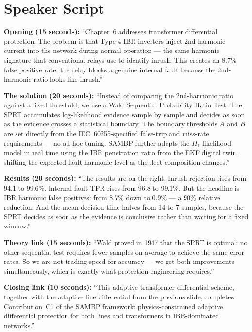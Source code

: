 \documentclass[12pt,a4paper]{article}
\begin{document}
\section{Speaker Script}

\begin{speakbox}
\textbf{Opening (15 seconds):}
``Chapter~6 addresses transformer differential protection. The problem is that Type-4 IBR inverters inject 2nd-harmonic current into the network during normal operation --- the same harmonic signature that conventional relays use to identify inrush. This creates an 8.7\% false positive rate: the relay blocks a genuine internal fault because the 2nd-harmonic ratio looks like inrush.''

\medskip
\textbf{The solution (20 seconds):}
``Instead of comparing the 2nd-harmonic ratio against a fixed threshold, we use a Wald Sequential Probability Ratio Test. The SPRT accumulates log-likelihood evidence sample by sample and decides as soon as the evidence crosses a statistical boundary. The boundary thresholds $A$ and $B$ are set directly from the IEC~60255-specified false-trip and miss-rate requirements --- no ad-hoc tuning. SAMBP further adapts the $H_1$ likelihood model in real time using the IBR penetration ratio from the EKF digital twin, shifting the expected fault harmonic level as the fleet composition changes.''

\medskip
\textbf{Results (20 seconds):}
``The results are on the right. Inrush rejection rises from 94.1 to 99.6\%. Internal fault TPR rises from 96.8 to 99.1\%. But the headline is IBR harmonic false positives: from 8.7\% down to 0.9\% --- a 90\% relative reduction. And the mean decision time halves from 14 to 7 samples, because the SPRT decides as soon as the evidence is conclusive rather than waiting for a fixed window.''

\medskip
\textbf{Theory link (15 seconds):}
``Wald proved in 1947 that the SPRT is optimal: no other sequential test requires fewer samples on average to achieve the same error rates. So we are not trading speed for accuracy --- we get both improvements simultaneously, which is exactly what protection engineering requires.''

\medskip
\textbf{Closing link (10 seconds):}
``This adaptive transformer differential scheme, together with the adaptive line differential from the previous slide, completes Contribution~C1 of the SAMBP framework: physics-constrained adaptive differential protection for both lines and transformers in IBR-dominated networks.''
\end{speakbox}
\end{document}
